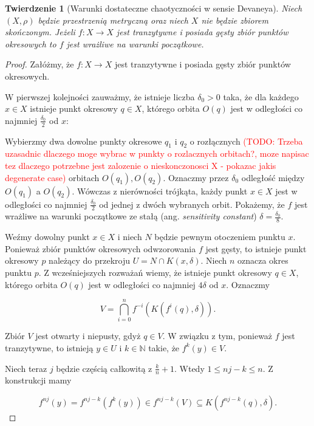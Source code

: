 \documentclass[licencjacka]{pwr_wmat_praca_dyplomowa}
\theoremstyle{plain}
\newtheorem{theorem}{Twierdzenie}
\numberwithin{theorem}{chapter}
\theoremstyle{definition}
\numberwithin{theorem}{chapter}
\begin{document}
\begin{theorem}
[Warunki dostateczne chaotyczności w sensie Devaneya]
\label{warunki_dostateczne_chaotycznosci_devaneya}
\cite{onDeveneyDefinitionOfChaos}
Niech $(X, \rho)$ będzie przestrzenią metryczną oraz niech $X$ nie będzie zbiorem skończonym.
Jeżeli $f: X \rightarrow X$ jest tranzytywne i posiada gęsty zbiór punktów okresowych to $f$ jest wrażliwe na warunki początkowe.
\end{theorem}

\begin{proof}
\cite{onDeveneyDefinitionOfChaos}
Załóżmy, że $f: X \rightarrow X$ jest tranzytywne i posiada gęsty zbiór punktów okresowych.

W pierwszej kolejności zauważmy, że istnieje liczba $\delta_0 > 0$ taka, że dla każdego $x \in X$ istnieje punkt okresowy $q \in X$, którego orbita $O(q)$ jest w odległości co najmniej $\frac{\delta_0}{2}$ od $x$: 

Wybierzmy dwa dowolne punkty okresowe $q_1$ i $q_2$ o rozłącznych \textcolor{red}{(TODO: Trzeba uzasadnic dlaczego moge wybrac w punkty o rozlacznych orbitach?, moze napisac tez dlaczego potrzebne jest zalozenie o nieskonczonosci X - pokazac jakis degenerate case)} orbitach $O(q_1), O(q_2)$. Oznaczmy przez $\delta_0$ odległość między $O(q_1)$ a $O(q_2)$. Wówczas z nierówności trójkąta, każdy punkt $x \in X$ jest w odległości co najmniej $\frac{\delta_0}{2}$ od  jednej z dwóch wybranych orbit.
Pokażemy, że $f$ jest wrażliwe na warunki początkowe ze stałą (ang. \textit{sensitivity constant}) $\delta = \frac{\delta_0}{8}.$

Weźmy dowolny punkt $x \in X$ i niech $N$ będzie pewnym otoczeniem punktu $x$. Ponieważ zbiór punktów okresowych odwzorowania $f$ jest gęsty, to istnieje punkt okresowy $p$ należący do przekroju $U = N \cap K(x, \delta)$. Niech $n$ oznacza okres punktu $p$. Z wcześniejszych rozważań wiemy, że istnieje punkt okresowy $q \in X$, którego orbita $O(q)$ jest w odległości co najmniej $4\delta$ od $x$. Oznaczmy

$$V = \bigcap_{i=0}^n f^{-i}(K(f^i(q), \delta)).$$

Zbiór $V$ jest otwarty i niepusty, gdyż $q \in V.$ W związku z tym, ponieważ $f$ jest tranzytywne, to istnieją $y \in U$ i $k \in \mathbb{N}$ takie, że $f^k(y) \in V$.

Niech teraz $j$ będzie częścią całkowitą z $\frac{k}{n} + 1$. Wtedy $1 \leq nj - k \leq n$. Z konstrukcji mamy

$$f^{nj}(y) = f^{nj-k}(f^k(y)) \in f^{nj-k}(V) \subseteq K(f^{nj-k}(q), \delta).$$


\end{proof}
\end{document}

